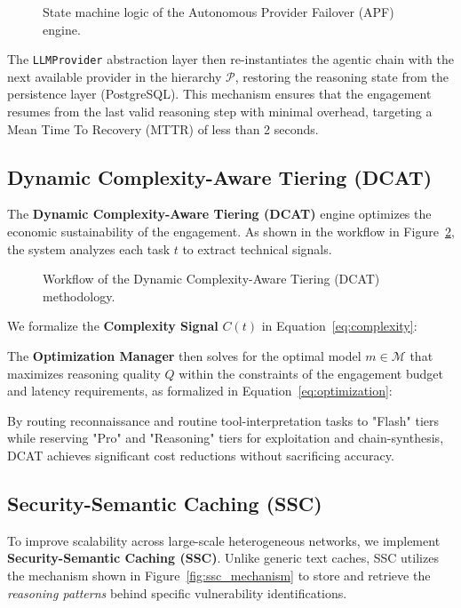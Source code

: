 \begin{figure}[!t]
    \centering
    \resizebox{0.85\columnwidth}{!}{
        
    }
    \caption{State machine logic of the Autonomous Provider Failover (APF) engine.}
    \label{fig:apf_state}
\end{figure}

The \texttt{LLMProvider} abstraction layer then re-instantiates the agentic chain with the next available provider in the hierarchy $\mathcal{P}$, restoring the reasoning state from the persistence layer (PostgreSQL). This mechanism ensures that the engagement resumes from the last valid reasoning step with minimal overhead, targeting a Mean Time To Recovery (MTTR) of less than 2 seconds.

\subsection{Dynamic Complexity-Aware Tiering (DCAT)}
\label{sec:dcat}
The \textbf{Dynamic Complexity-Aware Tiering (DCAT)} engine optimizes the economic sustainability of the engagement. As shown in the workflow in Figure~\ref{fig:dcat_flow}, the system analyzes each task $t$ to extract technical signals.

\begin{figure}[!t]
    \centering
    \resizebox{0.7\textwidth}{!}{
        
    }
    \caption{Workflow of the Dynamic Complexity-Aware Tiering (DCAT) methodology.}
    \label{fig:dcat_flow}
\end{figure}

We formalize the \textbf{Complexity Signal} $C(t)$ in Equation~\ref{eq:complexity}:


The \textbf{Optimization Manager} then solves for the optimal model $m \in \mathcal{M}$ that maximizes reasoning quality $Q$ within the constraints of the engagement budget and latency requirements, as formalized in Equation~\ref{eq:optimization}:


By routing reconnaissance and routine tool-interpretation tasks to "Flash" tiers while reserving "Pro" and "Reasoning" tiers for exploitation and chain-synthesis, DCAT achieves significant cost reductions without sacrificing accuracy.

\subsection{Security-Semantic Caching (SSC)}
\label{sec:ssc}
To improve scalability across large-scale heterogeneous networks, we implement \textbf{Security-Semantic Caching (SSC)}. Unlike generic text caches, SSC utilizes the mechanism shown in Figure~\ref{fig:ssc_mechanism} to store and retrieve the \textit{reasoning patterns} behind specific vulnerability identifications.


